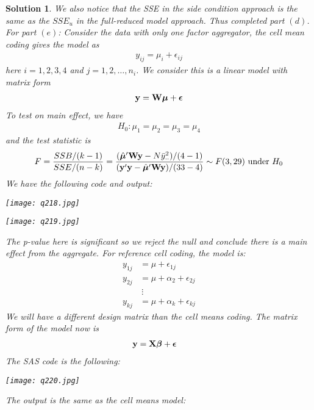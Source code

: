 \documentclass[11pt]{article}
\newtheorem{sol}{Solution}
\begin{document}
\begin{sol}
We also notice that the SSE in the side condition approach is the same as the $SSE_u$ in the full-reduced model approach.\vskip 2mm
	Thus completed part $(d)$.\vskip 2mm
	For part $(e)$:\vskip 2mm
	Consider the data with only one factor aggregator, the cell mean coding gives the model as
	\begin{align*}
		y_{ij} = \mu_i+ \epsilon_{ij}
	\end{align*}
	here $i = 1, 2, 3, 4$ and $j = 1, 2, \ldots, n_i$.\vskip 2mm
	We consider this is a linear model with matrix form
	\begin{align*}
		{\bf y} = {\bf W}{\bm\mu} + {\bm\epsilon}
	\end{align*}
	To test on main effect, we have
	\begin{align*}
		H_0: \mu_{1} = \mu_2 = \mu_3 = \mu_4
	\end{align*}
	and the test statistic is 
	\begin{align*}
		F = \frac{SSB/(k - 1)}{SSE/(n - k)} = \frac{(\hat{{\bm\mu}}'{\bf W}{\bf y} - N\bar{y}^2_{\cdot\cdot})/(4 - 1)}{({\bf y}'{\bf y} - \hat{{\bm\mu}}'{\bf W}{\bf y})/(33 - 4)} \sim F(3, 29) \text{ under }H_0
	\end{align*}
	We have the following code and output:
	\begin{center}
		\texttt{[image: q218.jpg]}
	\end{center}
	\begin{center}
		\texttt{[image: q219.jpg]}
	\end{center}
	The p-value here is significant so we reject the null and conclude there is a main effect from the aggregate.\vskip 2mm
	For reference cell coding, the model is:
	\begin{align*}
		y_{1j} &= \mu + \epsilon_{1j}\\
		y_{2j} &= \mu + \alpha_2 + \epsilon_{2j}\\
		&\ \vdots\\
		y_{kj} &= \mu + \alpha_k + \epsilon_{kj}
	\end{align*}
	We will have a different design matrix than the cell means coding. The matrix form of the model now is
	\begin{align*}
		{\bf y} &= {\bf X}{\bm\beta} + {\bm\epsilon}
	\end{align*}
	The SAS code is the following:
	\begin{center}
		\texttt{[image: q220.jpg]}
	\end{center}
	The output is the same as the cell means model:
	\begin{center}

\end{center}
\end{sol}
\end{document}
